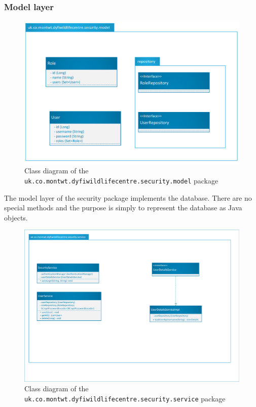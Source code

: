 \subsubsection{Model layer}
\begin{figure}[H]
	\includegraphics[scale=0.7]{diagrams/security/model}
	\caption{Class diagram of the \texttt{uk.co.montwt.dyfiwildlifecentre.security.model} package}
\end{figure}

The model layer of the security package implements the database. There are no special methods and the purpose is simply to represent the database as Java objects.

\begin{figure}[H]
	\includegraphics[scale=0.6]{diagrams/security/service}
	\caption{Class diagram of the \texttt{uk.co.montwt.dyfiwildlifecentre.security.service} package}
\end{figure}

